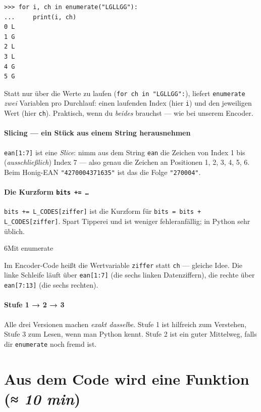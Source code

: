 \begin{verbatim}
>>> for i, ch in enumerate("LGLLGG"):
...     print(i, ch)
0 L
1 G
2 L
3 L
4 G
5 G
\end{verbatim}

Statt nur über die Werte zu laufen (\texttt{for ch in "LGLLGG":}),
liefert \texttt{enumerate} \emph{zwei} Variablen pro Durchlauf: einen
laufenden Index (hier \texttt{i}) und den jeweiligen Wert (hier
\texttt{ch}). Praktisch, wenn du \emph{beides} brauchst — wie bei
unserem Encoder.

\paragraph{Slicing — ein Stück aus einem String herausnehmen}
\texttt{ean[1:7]} ist eine \emph{Slice}: nimm aus dem String
\texttt{ean} die Zeichen von Index 1 bis (\emph{ausschließlich})
Index 7 — also genau die Zeichen an Positionen 1, 2, 3, 4, 5, 6.
Beim Honig-EAN \texttt{"4270004371635"} ist das die Folge
\texttt{"270004"}.

\paragraph{Die Kurzform \texttt{bits += \dots}}
\texttt{bits += L\_CODES[ziffer]} ist die Kurzform für
\texttt{bits = bits + L\_CODES[ziffer]}. Spart Tipperei und ist
weniger fehleranfällig; in Python sehr üblich.

\begin{pythoneinheit}{6}{Mit enumerate}

Im Encoder-Code heißt die Wertvariable \texttt{ziffer} statt
\texttt{ch} — gleiche Idee. Die linke Schleife läuft über
\texttt{ean[1:7]} (die sechs linken Datenziffern), die rechte
über \texttt{ean[7:13]} (die sechs rechten).

\paragraph{Stufe 1 → 2 → 3}
Alle drei Versionen machen \emph{exakt dasselbe}. Stufe 1 ist
hilfreich zum Verstehen, Stufe 3 zum Lesen, wenn man Python kennt.
Stufe 2 ist ein guter Mittelweg, falls dir \texttt{enumerate} noch
fremd ist.
\end{pythoneinheit}

\section{Aus dem Code wird eine Funktion \normalfont(\textit{≈ 10 min})}

